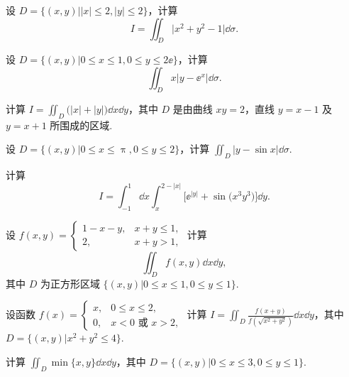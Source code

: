 	\begin{ti}
		设 $D = \bigl\{ (x,y) \bigl| |x| \leq 2, |y| \leq 2 \bigr\}$，计算
		\[
			I = \iint_{D} \bigl| x^{2} + y^{2} - 1 \bigr| \dd{\sigma}.
		\]
	\end{ti}

	\begin{ti}
		设 $D = \bigl\{ (x,y) \bigl| 0 \leq x \leq 1, 0 \leq y \leq 2\ee \bigr\}$，计算
		\[
			\iint_{D} x \bigl| y - \ee^{x} \bigr| \dd{\sigma}.
		\]
	\end{ti}

	\begin{ti}
		计算 $I = \iint_{D} \bigl( |x| + |y| \bigr) \dd{x} \dd{y}$，其中 $D$ 是由曲线 $xy = 2$，直线 $y = x - 1$ 及 $y = x + 1$ 所围成的区域.
	\end{ti}

	\begin{ti}
		设 $D = \bigl\{ (x,y) \bigl| 0 \leq x \leq \uppi, 0 \leq y \leq 2 \bigr\}$，计算 $\iint_{D} \bigl| y - \sin x \bigr| \dd{\sigma}$.
	\end{ti}

	\begin{ti}
		计算
		\[
			I = \int_{-1}^{1} \dd{x} \int_{x}^{2 - |x|} \bigl[ \ee^{|y|} + \sin \bigl( x^{3}y^{3} \bigr) \bigr] \dd{y}.
		\]
	\end{ti}

	\begin{ti}
		设 $f(x,y) = \begin{cases}
			1 - x - y, & x + y \leq 1,\\
			2, & x + y > 1,
		\end{cases}$ 计算
		\[
			\iint_{D} f(x,y) \dd{x} \dd{y},
		\]
		其中 $D$ 为正方形区域 $\bigl\{ (x,y) \bigl| 0 \leq x \leq 1, 0 \leq y \leq 1 \bigr\}$.
	\end{ti}

	\begin{ti}
		设函数 $f(x) = \begin{cases}
			x, & 0 \leq x \leq 2,\\
			0, & x < 0 \text{\ 或\ } x > 2,
		\end{cases}$ 计算 $I = \iint_{D} \frac{f(x + y)}{f\left( \sqrt{x^{2} + y^{2}} \right)} \dd{x} \dd{y}$，其中 $D = \bigl\{ (x,y) \bigl| x^{2} + y^{2} \leq 4 \bigr\}$.
	\end{ti}

	\begin{ti}
		计算 $\iint_{D} \min\bigl\{ x,y \bigr\} \dd{x} \dd{y}$，其中 $D = \bigl\{ (x,y) \bigl| 0 \leq x \leq 3, 0 \leq y \leq 1 \bigr\}$.
	\end{ti}

